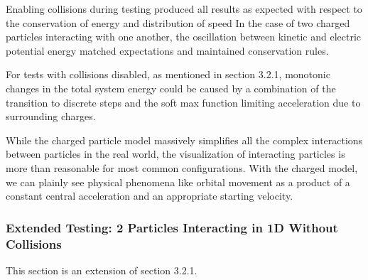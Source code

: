 \documentclass{article}
\begin{document}
Enabling collisions during testing produced all results as expected
with respect to the conservation of energy and distribution of speed
In the case of two charged particles interacting with one another,
the oscillation between kinetic and electric potential energy matched
expectations and maintained conservation rules.

For tests with collisions disabled, as mentioned in section 3.2.1,
monotonic changes in the total system energy could be caused
by a combination of the transition to discrete steps and
the soft max function limiting acceleration due to surrounding charges.

While the charged particle model massively simplifies all the complex interactions between particles in the real world,
the visualization of interacting particles is more than reasonable for most common configurations.
With the charged model, we can plainly see physical phenomena like orbital movement as a product of a constant central acceleration
and an appropriate starting velocity.

\subsubsection{Extended Testing: 2 Particles Interacting in 1D Without Collisions}
This section is an extension of section 3.2.1.
\end{document}
